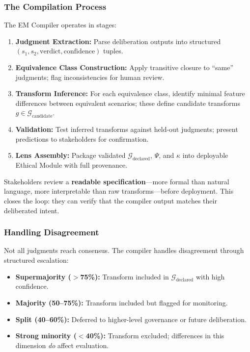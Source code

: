 \documentclass[12pt]{article}
\begin{document}
\subsubsection{The Compilation Process}

The EM Compiler operates in stages:

\begin{enumerate}
\item \textbf{Judgment Extraction:} Parse deliberation outputs into structured $(s_1, s_2, \text{verdict}, \text{confidence})$
tuples.
\item \textbf{Equivalence Class Construction:} Apply transitive closure to ``same'' judgments; flag
inconsistencies for human review.
\item \textbf{Transform Inference:} For each equivalence class, identify minimal feature differences between equivalent scenarios; these define candidate transforms $g \in \mathcal{G}_{\text{candidate}}$.
\item \textbf{Validation:} Test inferred transforms against held-out judgments; present predictions to
stakeholders for confirmation.
\item \textbf{Lens Assembly:} Package validated $\mathcal{G}_{\text{declared}}$, $\Psi$, and $\kappa$ into deployable Ethical Module with
full provenance.
\end{enumerate}

Stakeholders review a \textbf{readable specification}---more formal than natural language, more interpretable than raw transforms---before deployment. This closes the loop: they can verify that
the compiler output matches their deliberated intent.

\subsubsection{Handling Disagreement}

Not all judgments reach consensus. The compiler handles disagreement through structured escalation:

\begin{itemize}
\item \textbf{Supermajority ($>$75\%):} Transform included in $\mathcal{G}_{\text{declared}}$ with high confidence.
\item \textbf{Majority (50--75\%):} Transform included but flagged for monitoring.
\item \textbf{Split (40--60\%):} Deferred to higher-level governance or future deliberation.
\item \textbf{Strong minority ($<$40\%):} Transform excluded; differences in this dimension \emph{do} affect
evaluation.
\end{itemize}
\end{document}
